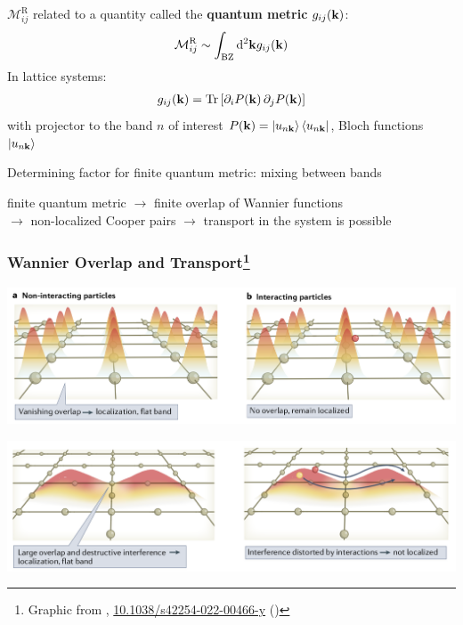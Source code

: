 \documentclass[aspectratio=169]{beamer}
\DeclareMathOperator{\Tr}{Tr}
\begin{document}
\begin{frame}
	\(\mathcal{M}_{ij}^{\textrm{R}}\) related to a quantity called the \textbf{quantum metric} \(g_{ij} (\mathbf{k})\):
	\begin{equation}
		\mathcal{M}_{ij}^{\textrm{R}} \sim \int_{\textrm{BZ}} \odif[order=2]{\vb{k}} g_{ij} (\vb{k})
	\end{equation}\pause
	In lattice systems:
	\begin{align}
		g_{ij} (\vb{k}) = \Tr{\left[\pdif{i} P(\vb{k}) \pdif{j} P(\vb{k}) \right]} 
	\end{align}
	with projector to the band \(n\) of interest \(P(\mathbf{k}) = \ket{u_{n \mathbf{k}}} \bra{u_{n \mathbf{k}}}\), Bloch functions \(\ket{u_{n \mathbf{k}}}\)

	
	Determining factor for finite quantum metric: mixing between bands\pause
	
	\begin{block}{}
		 \begin{center}
		 	finite quantum metric \pause\(\to\) finite overlap of Wannier functions \\ \pause \(\to\) non-localized Cooper pairs \pause\(\to\) transport in the system is possible
		 \end{center}
	\end{block}
\end{frame}

\begin{frame}
	\frametitle{Wannier Overlap and Transport\footnote[frame]{Graphic from \citeauthor{tormaSuperconductivitySuperfluidityQuantum2022}, \href{https://doi.org/10.1038/s42254-022-00466-y}{10.1038/s42254-022-00466-y} (\citeyear{tormaSuperconductivitySuperfluidityQuantum2022})}}
	
	\begin{center}
		\includegraphics[width=0.7\linewidth]{"figs/Wannier function overlap 1"}
	\end{center}	\pause
	\begin{center}
		\includegraphics[width=0.7\linewidth]{"figs/Wannier function overlap 2"}
	\end{center}
\end{frame}
\end{document}

